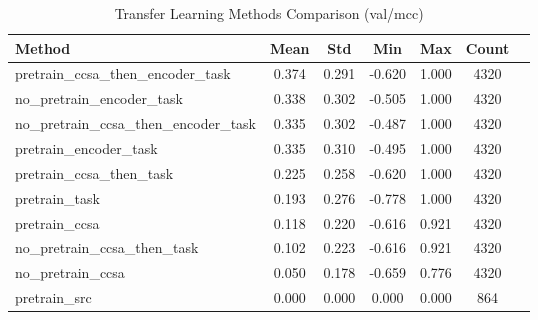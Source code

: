 \documentclass{article}
\begin{document}
\begin{table}[h!]
\centering
\caption{Transfer Learning Methods Comparison (val/mcc)}
\begin{tabular}{lcccccc}
\toprule
Method & Mean & Std & Min & Max & Count \\
\midrule
pretrain\_ccsa\_then\_encoder\_task & 0.374 & 0.291 & -0.620 & 1.000 & 4320 \\
no\_pretrain\_encoder\_task & 0.338 & 0.302 & -0.505 & 1.000 & 4320 \\
no\_pretrain\_ccsa\_then\_encoder\_task & 0.335 & 0.302 & -0.487 & 1.000 & 4320 \\
pretrain\_encoder\_task & 0.335 & 0.310 & -0.495 & 1.000 & 4320 \\
pretrain\_ccsa\_then\_task & 0.225 & 0.258 & -0.620 & 1.000 & 4320 \\
pretrain\_task & 0.193 & 0.276 & -0.778 & 1.000 & 4320 \\
pretrain\_ccsa & 0.118 & 0.220 & -0.616 & 0.921 & 4320 \\
no\_pretrain\_ccsa\_then\_task & 0.102 & 0.223 & -0.616 & 0.921 & 4320 \\
no\_pretrain\_ccsa & 0.050 & 0.178 & -0.659 & 0.776 & 4320 \\
pretrain\_src & 0.000 & 0.000 & 0.000 & 0.000 & 864 \\
\bottomrule
\end{tabular}
\label{tab:transfer_learning_methods_val_mcc}
\end{table}
\end{document}

